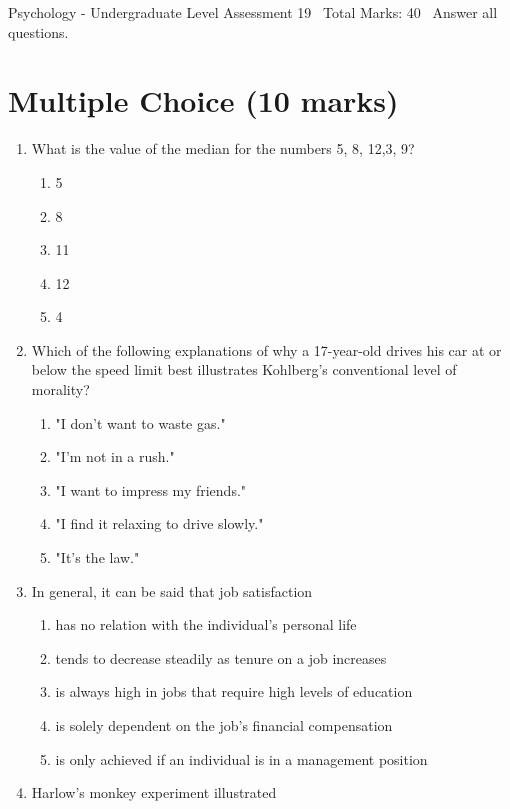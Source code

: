 \documentclass[12pt]{article}
\begin{document}
\begin{center}
Psychology - Undergraduate Level Assessment 19 \
Total Marks: 40 \
Answer all questions.
\end{center}

\section*{Multiple Choice (10 marks)}
\begin{enumerate}[label=\arabic*.]
\item What is the value of the median for the numbers 5, 8, 12,3, 9?
\begin{enumerate}[label=(\alph*)]
    \item 5
    \item 8
    \item 11
    \item 12
    \item 4
\end{enumerate}
\item Which of the following explanations of why a 17-year-old drives his car at or below the speed limit best illustrates Kohlberg's conventional level of morality?
\begin{enumerate}[label=(\alph*)]
    \item "I don't want to waste gas."
    \item "I'm not in a rush."
    \item "I want to impress my friends."
    \item "I find it relaxing to drive slowly."
    \item "It's the law."
\end{enumerate}
\item In general, it can be said that job satisfaction
\begin{enumerate}[label=(\alph*)]
    \item has no relation with the individual's personal life
    \item tends to decrease steadily as tenure on a job increases
    \item is always high in jobs that require high levels of education
    \item is solely dependent on the job's financial compensation
    \item is only achieved if an individual is in a management position
\end{enumerate}
\item Harlow's monkey experiment illustrated
\begin{enumerate}[label=(\alph*)]

\end{enumerate}
\end{enumerate}
\end{document}
